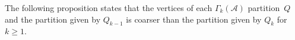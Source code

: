 %							
%							
%			

The following proposition states that the vertices of each $\Gamma_k(\mathcal A)$
partition~$Q$ and the partition given by $Q_{k-1}$ is coarser than the partition
given by $Q_k$ for~$k \ge 1$. 

